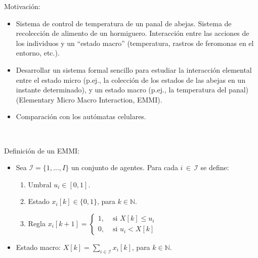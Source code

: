 \documentclass{article}
\begin{document}
Motivación: 
\begin{itemize}
\item Sistema de control de temperatura de un panal de abejas. Sistema de recolección de alimento de un hormiguero. Interacción entre las acciones de los individuos y un ``estado macro'' (temperatura, rastros de feromonas en el entorno, etc.).
\item Desarrollar un sistema formal sencillo para  estudiar la interacción elemental entre el estado micro (p.ej., la colección de los estados de las abejas en un instante determinado), y un estado macro (p.ej., la temperatura del panal) (Elementary Micro Macro Interaction, EMMI). 
\item Comparación con los autómatas celulares.
\end{itemize}

\

Definición de un EMMI:
\begin{itemize}
\item Sea $\mathcal{I}=\{1,\ldots,I\}$ un conjunto de agentes. Para cada $i\,{\in}\,\mathcal{I}$ se define:
	\begin{enumerate}[label=(\alph*)]
	\item Umbral $u_i\in[0,1]$.
	\item Estado $x_i[k]\in\{0, 1\}$, para $k\in\mathbb{N}$.
	\item Regla  $x_i[k+1]=\begin{cases} 1, & \mbox{ si }X[k]\leq u_i\\ 0, & \mbox{ si } u_i < X[k]\end{cases}$
	\end{enumerate}

\item Estado macro: $X[k]=\sum_{i\in\mathcal{I}} x_i[k]$, para $k\in\mathbb{N}$.
\end{itemize}
\end{document}
